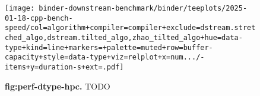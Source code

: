 \begin{figure}

\texttt{[image: binder-downstream-benchmark/binder/teeplots/2025-01-18-cpp-bench-speed/col=algorithm+compiler=compiler+exclude=dstream.stretched\_algo,dstream.tilted\_algo,zhao\_tilted\_algo+hue=data-type+kind=line+markers=+palette=muted+row=buffer-capacity+style=data-type+viz=relplot+x=num.../-items+y=duration-s+ext=.pdf]}

\caption{
\textbf{fig:perf-dtype-hpc.}
\footnotesize
TODO
}
\label{fig:perf-dtype-hpc}
\end{figure}
